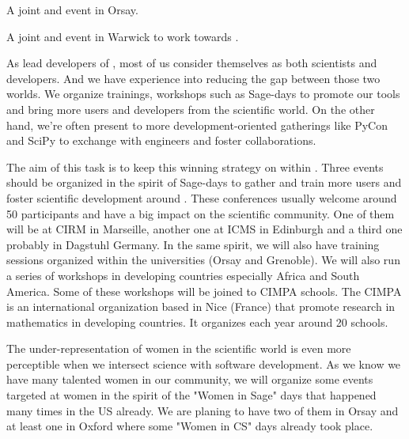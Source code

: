 \begin{workpackage}
\begin{tasklist}
\begin{task}[title=Community building: development workshops, lead=PS, id=devel-workshops]
\begin{compactitem}
\item A joint \Jupyter and \Sage event in Orsay.

\item A joint \LMFDB and \Sage event in Warwick to work towards
  .

\end{compactitem}


\end{task}

\begin{task}[title=Dissemination: reaching users, lead=PS, id=dissemination]

As lead developers of \TheProject, most of us consider themselves as both scientists and developers.
And we have experience into reducing the gap between those two worlds. We organize trainings, workshops such as Sage-days to promote our tools and bring more users and developers from the scientific world. On the other hand, we're often present to more development-oriented gatherings like PyCon and SciPy to exchange with engineers and foster collaborations.

The aim of this task is to keep this winning strategy on within \TheProject. Three events should be organized in the spirit of Sage-days to gather and train more users and foster scientific development around \TheProject. These conferences usually welcome around 50 participants and have a big impact on the scientific community. One of them will be at CIRM in Marseille, another one at ICMS in Edinburgh and a third one probably in Dagstuhl Germany. In the same spirit, we will also have training sessions organized within the universities (Orsay and Grenoble). We will also run a series of workshops in developing countries especially Africa and South America. Some of these workshops will be joined to CIMPA schools.
The CIMPA is an international organization based in Nice (France) that promote
research in mathematics in developing countries. It organizes each year around
20 schools.

The under-representation of women in the scientific world is even more perceptible when we intersect science with software development. As we know we have many talented women in our community, we will organize some events targeted at women in the spirit of the "Women in Sage" days that happened many times in the US already. We are planing to have two of them in Orsay and at least one in Oxford where some "Women in CS" days already took place.


\end{task}
\end{tasklist}
\end{workpackage}
